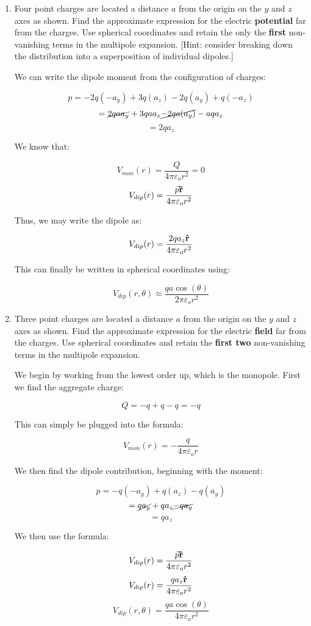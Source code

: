 \begin{enumerate}

  \item Four point charges are located a distance $a$ from the origin on the $y$ and $z$ axes as shown.  Find the approximate expression for the electric \textbf{potential} far from the charges.  Use spherical coordinates and retain the only the \textbf{first} non-vanishing terms in the multipole expansion. [Hint: consider breaking down the distribution into a superposition of individual dipoles.]

    We can write the dipole moment from the configuration of charges:

    $$p=-2q(-a_y)+3q(a_z)-2q(a_y)+q(-a_z)$$
    $$=\cancel{2qaa_y}+3qaa_z\cancel{-2qa(a_y)}-aqa_z$$
    $$=2qa_z$$

    We know that:

    $$V_{mon}(r)=\frac{Q}{4\pi\varepsilon_o r^2}=0$$
    $$V_{dip}(r)=\frac{\vec{p}\bold{\hat{r}}}{4\pi\varepsilon_o r^2}$$

    Thus, we may write the dipole as:

    $$V_{dip}(r)=\frac{2qa_z\bold{\hat{r}}}{4\pi\varepsilon_o r^2}$$

    This can finally be written in spherical coordinates using:

    $$\boxed{V_{dip}(r,\theta)\approx\frac{qa\cos(\theta)}{2\pi\varepsilon_o r^2}}$$

  \item Three point charges are located a distance $a$ from the origin on the $y$ and $z$ axes as shown.  Find the approximate expression for the electric \textbf{field} far from the charges.  Use spherical coordinates and retain the \textbf{first two} non-vanishing terms in the multipole expansion.

    We begin by working from the lowest order up, which is the monopole. First we find the aggregate charge:

    $$Q=-q+q-q=-q$$

    This can simply be plugged into the formula:

    $$V_{mon}(r)=-\frac{q}{4\pi\varepsilon_o r}$$

    We then find the dipole contribution, beginning with the moment:

    $$p=-q(-a_y)+q(a_z)-q(a_y)$$
    $$=\cancel{qa_y}+qa_z\cancel{-qa_y}$$
    $$=qa_z$$

    We then use the formula:

    $$V_{dip}(r)=\frac{\vec{p}\bold{\hat{r}}}{4\pi\varepsilon_o r^2}$$
    $$V_{dip}(r)=\frac{qa_z\bold{\hat{r}}}{4\pi\varepsilon_o r^2}$$
    $$V_{dip}(r,\theta)=\frac{qa\cos(\theta)}{4\pi\varepsilon_o r^2}$$


\end{enumerate}
